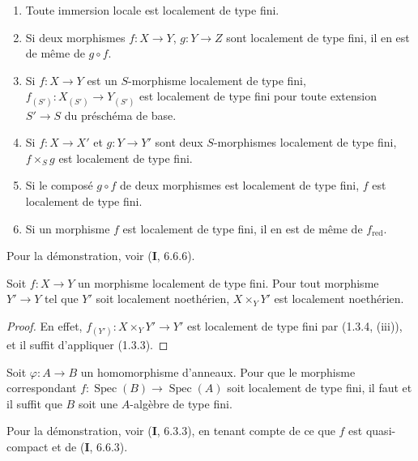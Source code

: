\begin{proposition}[1.3.4]
\label{IV.1.3.4-fr}
\begin{enumerate}
  \item[\textup{(i)}] Toute immersion locale est localement de type fini.
  \item[\textup{(ii)}] Si deux morphismes $f:X\to Y$, $g:Y\to Z$ sont localement de
  type fini, il en est de même de $g\circ f$.
  \item[\textup{(iii)}] Si $f:X\to Y$ est un $S$-morphisme localement de type fini,
  $f_{(S')}:X_{(S')}\to Y_{(S')}$ est localement de type fini pour toute
  extension $S'\to S$ du préschéma de base.
  \item[\textup{(iv)}] Si $f:X\to X'$ et $g:Y\to Y'$ sont deux $S$-morphismes
  localement de type fini, $f\times_Sg$ est localement de type fini.
  \item[\textup{(v)}] Si le composé $g\circ f$ de deux morphismes est localement de
  type fini, $f$ est localement de type fini.
  \item[\textup{(vi)}] Si un morphisme $f$ est localement de type fini, il en est de
  même de $f_{\mathrm{red}}$.
\end{enumerate}
\end{proposition}

Pour la démonstration, voir (\textbf{I}, 6.6.6).

\begin{corollary}[1.3.5]
\label{IV.1.3.5-fr}
Soit $f:X\to Y$ un morphisme localement de type fini. Pour tout morphisme
$Y'\to Y$ tel que $Y'$ soit localement noethérien, $X\times_YY'$ est
localement noethérien.
\end{corollary}

\begin{proof}
En effet, $f_{(Y')}:X\times_YY'\to Y'$ est localement de type fini par
(1.3.4, (iii)), et il suffit d'appliquer (1.3.3).
\end{proof}

\begin{proposition}[1.3.6]
\label{IV.1.3.6-fr}
Soit $\varphi:A\to B$ un homomorphisme d'anneaux. Pour que le morphisme
correspondant $f:\operatorname{Spec}(B)\to\operatorname{Spec}(A)$ soit localement de type fini, il faut et
il suffit que $B$ soit une $A$-algèbre de type fini.
\end{proposition}

Pour la démonstration, voir (\textbf{I}, 6.3.3), en tenant compte de ce que $f$ est
quasi-compact et de (\textbf{I}, 6.6.3).

